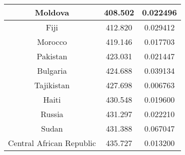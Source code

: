 \documentclass[a4 paper]{article}
\newcommand{\0}{\mathbf{0}}
\begin{document}
\begin{itemize}
\begin{table}[!ht]
\begin{tabular}{|c|c|c|}
        Moldova & 408.502 & 0.022496\\\hline
        Fiji & 412.820 & 0.029412\\\hline
        Morocco & 419.146 & 0.017703\\\hline
        Pakistan & 423.031 & 0.021447\\\hline
        Bulgaria & 424.688 & 0.039134\\\hline
        Tajikistan & 427.698 & 0.006763\\\hline
        Haiti & 430.548 & 0.019600\\\hline
        Russia & 431.297 & 0.022210\\\hline
        Sudan & 431.388 & 0.067047\\\hline
        Central African Republic & 435.727 & 0.013200\\\hline
    
    \end{tabular}
    \end{table}
    
    \newpage
    
    
\end{itemize}
\end{document}
